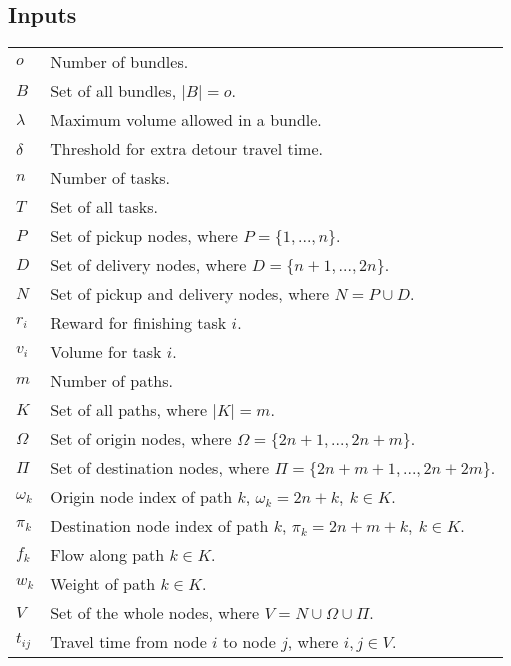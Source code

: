 \documentclass{article}
\begin{document}
\begin{multicols}{2}

\setcounter{secnumdepth}{0} %

\section{Inputs}

\vspace{0.2cm}
\renewcommand{\arraystretch}{1.5}
\begin{supertabular}{L{0.58cm} L{7.2cm}}
	$o$ 		& Number of bundles. \\
	$B$ 		& Set of all bundles, $|B| = o$. \\
	$\lambda$ 	& Maximum volume allowed in a bundle. \\
	$\delta$ 	& Threshold for extra detour travel time. \\
	$n$ 		& Number of tasks. \\
	$T$ 		& Set of all tasks. \\
	$P$ 		& Set of pickup nodes, where $P = \{1,...,n\}$. \\
	$D$ 		& Set of delivery nodes, where $D = \{n+1,...,2n\}$. \\
	$N$ 		& Set of pickup and delivery nodes, where $N = P \cup D$. \\
	$r_i$ 		& Reward for finishing task $i$. \\
	$v_i$ 		& Volume for task $i$. \\
	$m$ 		& Number of paths. \\
	$K$ 		& Set of all paths, where $|K| = m$. \\
	$\Omega$ 	& Set of origin nodes, where $\Omega = \{2n+1,...,2n+m\}$. \\
	$\Pi$ 		& Set of destination nodes, where $\Pi = \{2n+m+1,...,2n+2m\}$. \\
	$\omega_k$ 	& Origin node index of path $k$, $\omega_k = 2n + k,~k \in K$. \\
	$\pi_k$ 	& Destination node index of path $k$, $\pi_k = 2n + m + k,~k \in K$. \\
	$f_k$ 		& Flow along path $k \in K$. \\
	$w_k$ 		& Weight of path $k \in K$. \\
	$V$ 		& Set of the whole nodes, where $V = N \cup \Omega \cup \Pi$. \\	
	$t_{ij}$ 	& Travel time from node $i$ to node $j$, where $i, j \in V$. \\
\end{supertabular}


\end{multicols}
\end{document}
